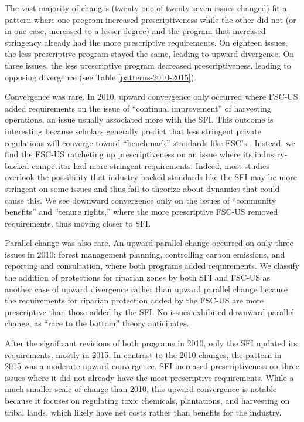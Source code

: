 \documentclass[
      12pt,
            Review ]{article}
\begin{document}
The vast majority of changes (twenty-one of twenty-seven issues changed)
fit a pattern where one program increased prescriptiveness while the
other did not (or in one case, increased to a lesser degree) and the
program that increased stringency already had the more prescriptive
requirements. On eighteen issues, the less prescriptive program stayed
the same, leading to upward divergence. On three issues, the less
prescriptive program decreased prescriptiveness, leading to opposing
divergence (see Table \ref{patterns-2010-2015}).



Convergence was rare. In 2010, upward convergence only occurred where
FSC-US added requirements on the issue of ``continual improvement'' of
harvesting operations, an issue usually associated more with the SFI.
This outcome is interesting because scholars generally predict that less
stringent private regulations will converge toward ``benchmark''
standards like FSC's \citep{Overdevest2005, Overdevest2010}. Instead, we
find the FSC-US ratcheting up prescriptiveness on an issue where its
industry-backed competitor had more stringent requirements. Indeed, most
studies overlook the possibility that industry-backed standards like the
SFI may be more stringent on some issues and thus fail to theorize about
dynamics that could cause this. We see downward convergence only on the
issues of ``community benefits'' and ``tenure rights,'' where the more
prescriptive FSC-US removed requirements, thus moving closer to SFI.

Parallel change was also rare. An upward parallel change occurred on
only three issues in 2010: forest management planning, controlling
carbon emissions, and reporting and consultation, where both programs
added requirements. We classify the addition of protections for riparian
zones by both SFI and FSC-US as another case of upward divergence rather
than upward parallel change because the requirements for riparian
protection added by the FSC-US are more prescriptive than those added by
the SFI. No issues exhibited downward parallel change, as ``race to the
bottom'' theory anticipates.

After the significant revisions of both programs in 2010, only the SFI
updated its requirements, mostly in 2015. In contrast to the 2010
changes, the pattern in 2015 was a moderate upward convergence. SFI
increased prescriptiveness on three issues where it did not already have
the most prescriptive requirements. While a much smaller scale of change
than 2010, this upward convergence is notable because it focuses on
regulating toxic chemicals, plantations, and harvesting on tribal lands,
which likely have net costs rather than benefits for the industry.
\end{document}
